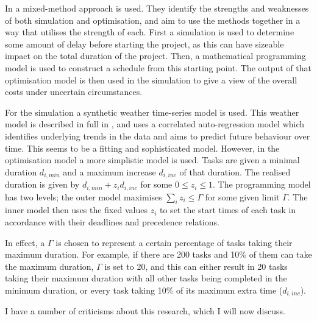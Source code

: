 \documentclass[a4paper,12pt]{article}
\begin{document}
\bigskip

In \cite{barlow2018mixed} a mixed-method approach is used. They identify the strengths and weaknesses of both simulation and optimisation, and aim to use the methods together in a way that utilises the strength of each. First a simulation is used to determine some amount of delay before starting the project, as this can have sizeable impact on the total duration of the project. Then, a mathematical programming model is used to construct a schedule from this starting point. The output of that optimisation model is then used in the simulation to give a view of the overall costs under uncertain circumstances. 

For the simulation a synthetic weather time-series model is used. This weather model is described in full in \cite{dinwoodie2014operational} , and uses a correlated auto-regression model which identifies underlying trends in the data and aims to predict future behaviour over time. This seems to be a fitting and sophisticated model. However, in the optimisation model a more simplistic model is used. Tasks are given a minimal duration $d_{i, min}$ and a maximum increase $d_{i, inc}$ of that duration. The realised duration is given by $d_{i,  min} + z_i d_{i, inc}$ for some $0 \leq z_i \leq 1$. The programming model has two levels; the outer model maximises $\sum_i z_i \leq \Gamma$ for some given limit $\Gamma$. The inner model then uses the fixed values $z_i$ to set the start times of each task in accordance with their deadlines and precedence relations. 

In effect, a $\Gamma$ is chosen to represent a certain percentage of tasks taking their maximum duration. For example, if there are 200 tasks and 10\% of them can take the maximum duration, $\Gamma$ is set to 20, and this can either result in 20 tasks taking their maximum duration with all other tasks being completed in the minimum duration, or every task taking 10\% of its maximum extra time ($d_{i, inc}$). 

\bigskip

I have a number of criticisms about this research, which I will now discuss.
\end{document}
